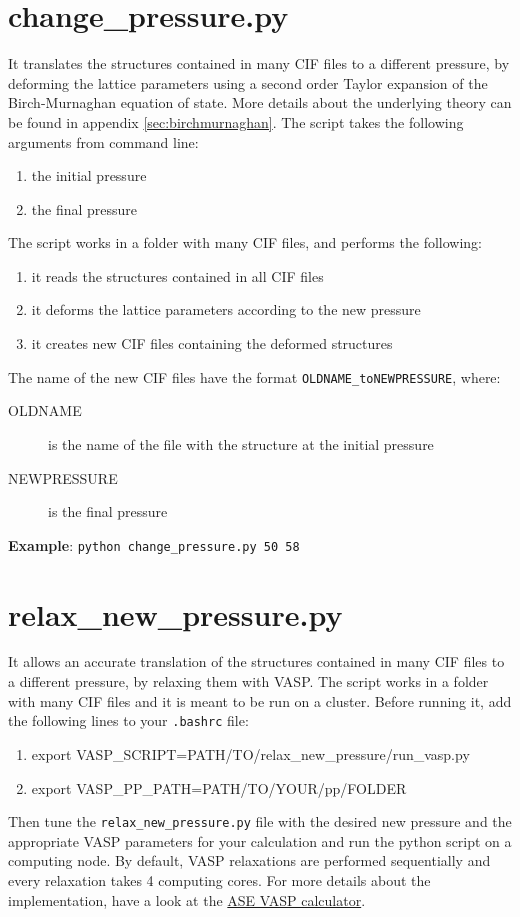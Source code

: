 \documentclass{article}
\begin{document}
\section{change\_pressure.py}
It translates the structures contained in many CIF files to a different pressure, by deforming the lattice parameters using a second order Taylor expansion of the Birch-Murnaghan equation of state. More details about the underlying theory can be found in appendix \ref{sec:birchmurnaghan}. The script takes the following arguments from command line:
\begin{enumerate}
	\item the initial pressure
	\item the final pressure
\end{enumerate}
The script works in a folder with many CIF files, and performs the following:
\begin{enumerate}
	\item it reads the structures contained in all CIF files
	\item it deforms the lattice parameters according to the new pressure
	\item it creates new CIF files containing the deformed structures
\end{enumerate}
The name of the new CIF files have the format \texttt{OLDNAME\_toNEWPRESSURE}, where:
\begin{description}
	\item[OLDNAME] is the name of the file with the structure at the initial pressure
	\item[NEWPRESSURE] is the final pressure
\end{description}
\textbf{Example}: \texttt{python change\_pressure.py 50 58}

\section{relax\_new\_pressure.py}
It allows an accurate translation of the structures contained in many CIF files to a different pressure, by relaxing them with VASP. The script works in a folder with many CIF files and it is meant to be run on a cluster. Before running it, add the following lines to your \texttt{.bashrc} file:
\begin{enumerate}
	\item export VASP\_SCRIPT=PATH/TO/relax\_new\_pressure/run\_vasp.py
	\item export VASP\_PP\_PATH=PATH/TO/YOUR/pp/FOLDER
\end{enumerate}
Then tune the \texttt{relax\_new\_pressure.py} file with the desired new pressure and the appropriate VASP parameters for your calculation and run the python script on a computing node. By default, VASP relaxations are performed sequentially and every relaxation takes 4 computing cores. For more details about the implementation, have a look at the \href{https://wiki.fysik.dtu.dk/ase/ase/calculators/vasp.html}{ASE VASP calculator}.
\end{document}
